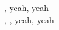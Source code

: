 \songwordfb{} \songwordfb{} , yeah, yeah \songwordfb{} \\
, \songwordfb{} , yeah, yeah \songwordfb{}\\